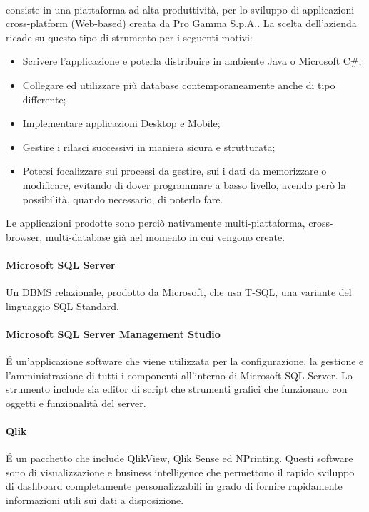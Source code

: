 \paragraph{\inde} consiste in una piattaforma ad alta produttività, per lo sviluppo di applicazioni cross-platform (Web-based) creata da Pro Gamma S.p.A.. La scelta dell'azienda ricade su questo tipo di strumento per i seguenti motivi:
\begin{itemize}
	\item Scrivere l'applicazione e poterla distribuire in ambiente Java o Microsoft C\#;
	\item Collegare ed utilizzare più database contemporaneamente anche di tipo differente;
	\item Implementare applicazioni Desktop e Mobile;
	\item Gestire i rilasci successivi in maniera sicura e strutturata;
	\item Potersi focalizzare sui processi da gestire, sui i dati da memorizzare o modificare, evitando di dover programmare a basso livello, avendo però la possibilità, quando necessario, di poterlo fare.
\end{itemize}
Le applicazioni prodotte sono perciò nativamente multi-piattaforma, cross-browser, multi-database già nel momento in cui vengono create.

\paragraph{Microsoft SQL Server} Un DBMS relazionale, prodotto da Microsoft, che usa T-SQL, una variante del linguaggio SQL Standard. 

\paragraph{Microsoft SQL Server Management Studio} \'E un'applicazione software che viene utilizzata per la configurazione, la gestione e l'amministrazione di tutti i componenti all'interno di Microsoft SQL Server. Lo strumento include sia editor di script che strumenti grafici che funzionano con oggetti e funzionalità del server.

\paragraph{Qlik}\'E un pacchetto che include QlikView, Qlik Sense ed NPrinting. Questi software sono di visualizzazione e business intelligence che permettono il rapido sviluppo di dashboard completamente personalizzabili in grado di fornire rapidamente informazioni utili sui dati a disposizione.

